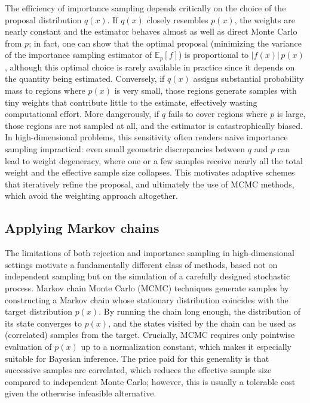 \medskip

The efficiency of importance sampling depends critically on the choice of the proposal distribution $q(x)$. If $q(x)$ closely resembles $p(x)$, the weights are nearly constant and the estimator behaves almost as well as direct Monte Carlo from $p$; in fact, one can show that the optimal proposal (minimizing the variance of the importance sampling estimator of $\mathbb{E}_p[f]$) is proportional to $|f(x)|\,p(x)$, although this optimal choice is rarely available in practice since it depends on the quantity being estimated. Conversely, if $q(x)$ assigns substantial probability mass to regions where $p(x)$ is very small, those regions generate samples with tiny weights that contribute little to the estimate, effectively wasting computational effort. More dangerously, if $q$ fails to cover regions where $p$ is large, those regions are not sampled at all, and the estimator is catastrophically biased. In high-dimensional problems, this sensitivity often renders naive importance sampling impractical: even small geometric discrepancies between $q$ and $p$ can lead to weight degeneracy, where one or a few samples receive nearly all the total weight and the effective sample size collapses. This motivates adaptive schemes that iteratively refine the proposal, and ultimately the use of MCMC methods, which avoid the weighting approach altogether.

\subsection*{Applying Markov chains}

The limitations of both rejection and importance sampling in high-dimensional settings motivate a fundamentally different class of methods, based not on independent sampling but on the simulation of a carefully designed stochastic process. Markov chain Monte Carlo (MCMC) techniques generate samples by constructing a Markov chain whose stationary distribution coincides with the target distribution $p(x)$. By running the chain long enough, the distribution of its state converges to $p(x)$, and the states visited by the chain can be used as (correlated) samples from the target. Crucially, MCMC requires only pointwise evaluation of $p(x)$ up to a normalization constant, which makes it especially suitable for Bayesian inference. The price paid for this generality is that successive samples are correlated, which reduces the effective sample size compared to independent Monte Carlo; however, this is usually a tolerable cost given the otherwise infeasible alternative.

